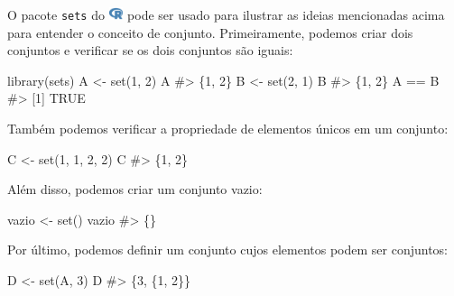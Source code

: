 \documentclass[
  letterpaper,
]{book}
\newenvironment{Shaded}{\begin{snugshade}}{\end{snugshade}}
\newcommand{\CommentTok}[1]{\textcolor[rgb]{0.37,0.37,0.37}{#1}}
\newcommand{\DecValTok}[1]{\textcolor[rgb]{0.68,0.00,0.00}{#1}}
\newcommand{\FunctionTok}[1]{\textcolor[rgb]{0.28,0.35,0.67}{#1}}
\newcommand{\NormalTok}[1]{\textcolor[rgb]{0.00,0.23,0.31}{#1}}
\newcommand{\OtherTok}[1]{\textcolor[rgb]{0.00,0.23,0.31}{#1}}
\newcommand{\SpecialCharTok}[1]{\textcolor[rgb]{0.37,0.37,0.37}{#1}}
\theoremstyle{plain}
\theoremstyle{definition}
\theoremstyle{remark}
\begin{document}
O pacote \texttt{sets} do
\includegraphics[width=1.13em,height=1em]{naive_set_theory_files/figure-pdf/fa-icon-9b00320707d42527dde67262afb33ded.pdf}
pode ser usado para ilustrar as ideias mencionadas acima para entender o
conceito de conjunto. Primeiramente, podemos criar dois conjuntos e
verificar se os dois conjuntos são iguais:

\begin{Shaded}
\begin{Highlighting}[]
\FunctionTok{library}\NormalTok{(sets)}
\NormalTok{A }\OtherTok{\textless{}{-}} \FunctionTok{set}\NormalTok{(}\DecValTok{1}\NormalTok{, }\DecValTok{2}\NormalTok{)}
\NormalTok{A}
\CommentTok{\#\textgreater{} \{1, 2\}}
\NormalTok{B }\OtherTok{\textless{}{-}} \FunctionTok{set}\NormalTok{(}\DecValTok{2}\NormalTok{, }\DecValTok{1}\NormalTok{)}
\NormalTok{B}
\CommentTok{\#\textgreater{} \{1, 2\}}
\NormalTok{A }\SpecialCharTok{==}\NormalTok{ B}
\CommentTok{\#\textgreater{} [1] TRUE}
\end{Highlighting}
\end{Shaded}

Também podemos verificar a propriedade de elementos únicos em um
conjunto:

\begin{Shaded}
\begin{Highlighting}[]
\NormalTok{C }\OtherTok{\textless{}{-}} \FunctionTok{set}\NormalTok{(}\DecValTok{1}\NormalTok{, }\DecValTok{1}\NormalTok{, }\DecValTok{2}\NormalTok{, }\DecValTok{2}\NormalTok{)}
\NormalTok{C}
\CommentTok{\#\textgreater{} \{1, 2\}}
\end{Highlighting}
\end{Shaded}

Além disso, podemos criar um conjunto vazio:

\begin{Shaded}
\begin{Highlighting}[]
\NormalTok{vazio }\OtherTok{\textless{}{-}} \FunctionTok{set}\NormalTok{()}
\NormalTok{vazio}
\CommentTok{\#\textgreater{} \{\}}
\end{Highlighting}
\end{Shaded}

Por último, podemos definir um conjunto cujos elementos podem ser
conjuntos:

\begin{Shaded}
\begin{Highlighting}[]
\NormalTok{D }\OtherTok{\textless{}{-}} \FunctionTok{set}\NormalTok{(A, }\DecValTok{3}\NormalTok{)}
\NormalTok{D}
\CommentTok{\#\textgreater{} \{3, \{1, 2\}\}}
\end{Highlighting}
\end{Shaded}
\end{document}
